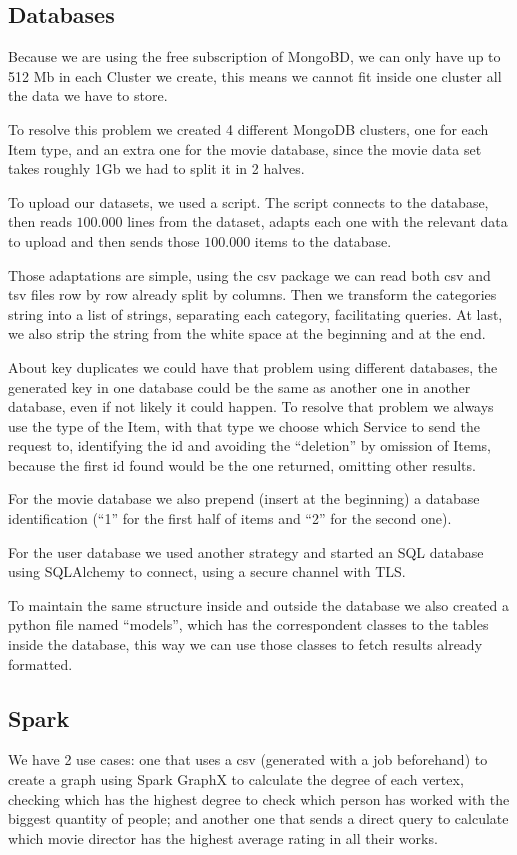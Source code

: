 \documentclass[oneside]{article}
\newcommand*\fpar{\hspace{1ex}}
\begin{document}
    \subsection{Databases}
    \fpar Because we are using the free subscription of MongoBD, we can only have up to 512 Mb in each Cluster we create, this means we cannot fit inside one cluster all the data we have to store.
    \par To resolve this problem we created 4 different MongoDB clusters, one for each Item type, and an extra one for the movie database, since the movie data set takes roughly 1Gb we had to split it in 2 halves.
    \par To upload our datasets, we used a script. The script connects to the database, then reads $100.000$ lines from the dataset, adapts each one with the relevant data to upload and then sends those $100.000$ items to the database. 
    \par Those adaptations are simple, using the csv package we can read both csv and tsv files row by row already split by columns. Then we transform the categories string into a list of strings, separating each category, facilitating queries. At last, we also strip the string from the white space at the beginning and at the end.
    \par About key duplicates we could have that problem using different databases, the generated key in one database could be the same as another one in another database, even if not likely it could happen. To resolve that problem we always use the type of the Item, with that type we choose which Service to send the request to, identifying the id and avoiding the “deletion” by omission of Items, because the first id found would be the one returned, omitting other results.
    \par For the movie database we also prepend (insert at the beginning) a database identification (“1” for the first half of items and “2” for the second one).
    \par For the user database we used another strategy and started an SQL database using SQLAlchemy to connect, using a secure channel with TLS.
    \par To maintain the same structure inside and outside the database we also created a python file named “models”, which has the correspondent classes to the tables inside the database, this way we can use those classes to fetch results already formatted. 

  \clearpage
  \subsection{Spark}
  \fpar We have 2 use cases: one that uses a csv (generated with a job beforehand) to create a graph using Spark GraphX to calculate the degree of each vertex, checking which has the highest degree to  check which person has worked with the biggest quantity of people; and another one that sends a direct query to calculate which movie director has the highest average rating in all their works.
\end{document}
